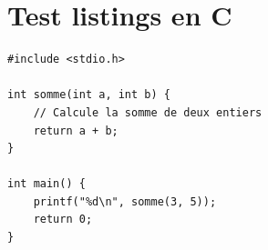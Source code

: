 \documentclass{article}
\begin{document}
\section*{Test listings en C}

\begin{lstlisting}[style=cstyle]
#include <stdio.h>

int somme(int a, int b) {
    // Calcule la somme de deux entiers
    return a + b;
}

int main() {
    printf("%d\n", somme(3, 5));
    return 0;
}
\end{lstlisting}
\end{document}

